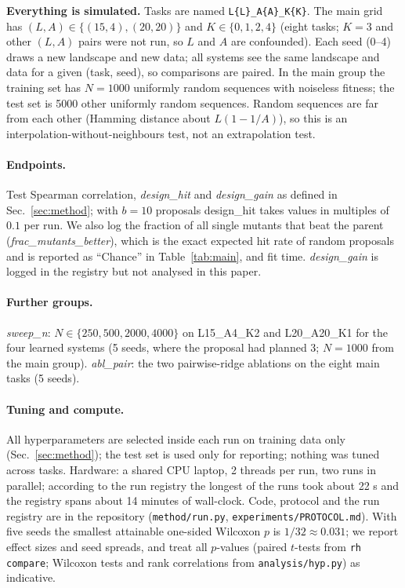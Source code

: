 \textbf{Everything is simulated.} Tasks are named \texttt{L\{L\}\_A\{A\}\_K\{K\}}. The main grid has $(L,A)\in\{(15,4),(20,20)\}$ and $K\in\{0,1,2,4\}$ (eight tasks; $K=3$ and other $(L,A)$ pairs were not run, so $L$ and $A$ are confounded). Each seed (0--4) draws a new landscape and new data; all systems see the same landscape and data for a given (task, seed), so comparisons are paired. In the main group the training set has $N=1000$ uniformly random sequences with noiseless fitness; the test set is 5000 other uniformly random sequences. Random sequences are far from each other (Hamming distance about $L(1-1/A)$), so this is an interpolation-without-neighbours test, not an extrapolation test.

\paragraph{Endpoints.} Test Spearman correlation, \emph{design\_hit} and \emph{design\_gain} as defined in Sec.~\ref{sec:method}; with $b=10$ proposals design\_hit takes values in multiples of $0.1$ per run. We also log the fraction of all single mutants that beat the parent (\emph{frac\_mutants\_better}), which is the exact expected hit rate of random proposals and is reported as ``Chance'' in Table~\ref{tab:main}, and fit time. \emph{design\_gain} is logged in the registry but not analysed in this paper.

\paragraph{Further groups.} \emph{sweep\_n}: $N\in\{250,500,2000,4000\}$ on L15\_A4\_K2 and L20\_A20\_K1 for the four learned systems (5 seeds, where the proposal had planned 3; $N=1000$ from the main group). \emph{abl\_pair}: the two pairwise-ridge ablations on the eight main tasks (5 seeds).

\paragraph{Tuning and compute.} All hyperparameters are selected inside each run on training data only (Sec.~\ref{sec:method}); the test set is used only for reporting; nothing was tuned across tasks. Hardware: a shared CPU laptop, 2 threads per run, two runs in parallel; according to the run registry the longest of the  runs took about 22 s and the registry spans about 14 minutes of wall-clock. Code, protocol and the run registry are in the repository (\texttt{method/run.py}, \texttt{experiments/PROTOCOL.md}). With five seeds the smallest attainable one-sided Wilcoxon $p$ is $1/32\approx0.031$; we report effect sizes and seed spreads, and treat all $p$-values (paired $t$-tests from \texttt{rh compare}; Wilcoxon tests and rank correlations from \texttt{analysis/hyp.py}) as indicative.

